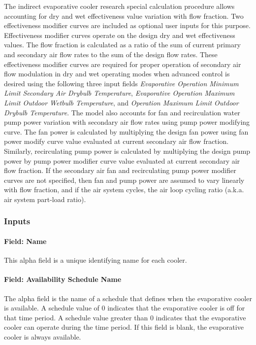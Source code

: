 The indirect evaporative cooler research special calculation procedure allows accounting for dry and wet effectiveness value variation with flow fraction. Two effectiveness modifier curves are included as optional user inputs for this purpose. Effectiveness modifier curves operate on the design dry and wet effectiveness values. The flow fraction is calculated as a ratio of the sum of current primary and secondary air flow rates to the sum of the design flow rates. These effectiveness modifier curves are required for proper operation of secondary air flow modulation in dry and wet operating modes when advanced control is desired using the following three input fields \textit{Evaporative Operation Minimum Limit Secondary Air Drybulb Temperature}, \textit{Evaporative Operation Maximum Limit Outdoor Wetbulb Temperature}, and \textit{Operation Maximum Limit Outdoor Drybulb Temperature}. The model also accounts for fan and recirculation water pump power variation with secondary air flow rates using pump power modifying curve. The fan power is calculated by multiplying the design fan power using fan power modify curve value evaluated at current secondary air flow fraction. Similarly, recirculating pump power is calculated by multiplying the design pump power by pump power modifier curve value evaluated at current secondary air flow fraction. If the secondary air fan and recirculating pump power modifier curves are not specified, then fan and pump power are assumed to vary linearly with flow fraction, and if the air system cycles, the air loop cycling ratio (a.k.a. air system part-load ratio).

\subsubsection{Inputs}\label{inputs-4-011}

\paragraph{Field: Name}\label{field-name-4-010}

This alpha field is a unique identifying name for each cooler.

\paragraph{Field: Availability Schedule Name}\label{field-availability-schedule-name-1-004}

The alpha field is the name of a schedule that defines when the evaporative cooler is available. A schedule value of 0 indicates that the evaporative cooler is off for that time period. A schedule value greater than 0 indicates that the evaporative cooler can operate during the time period. If this field is blank, the evaporative cooler is always available.

